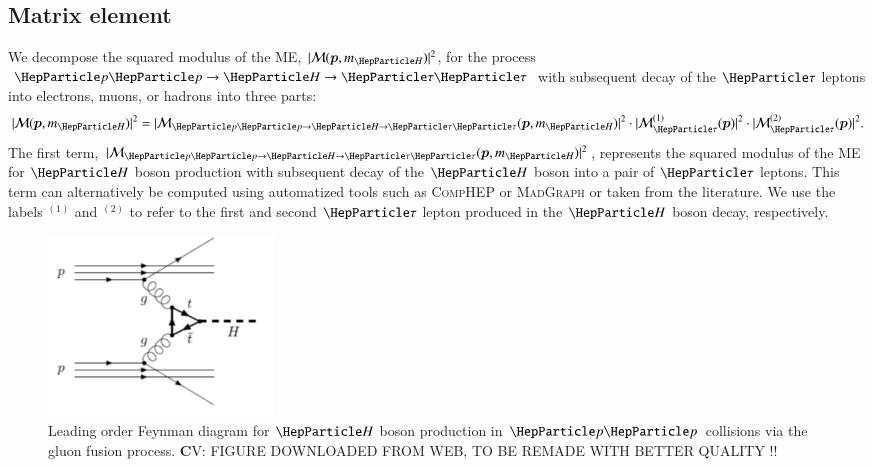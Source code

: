 \subsection{Matrix element}
\label{sec:mem_ME}

We decompose the squared modulus of the ME, $\vert \mathcal{M}(\bm{p},m_{\PHiggs}) \vert^{2}$, for the process $\Pp\Pp \to \PHiggs \to \Pgt\Pgt$
with subsequent decay of the $\Pgt$ leptons into electrons, muons, or
hadrons into three parts:
\begin{equation}
\vert \mathcal{M}(\bm{p},m_{\PHiggs}) \vert^{2} = 
 \vert \mathcal{M}_{\Pp\Pp \to \PHiggs \to \Pgt\Pgt}(\bm{p},m_{\PHiggs}) \vert^{2} 
\cdot \vert \mathcal{M}^{(1)}_{\Pgt}(\bm{p}) \vert^{2} 
\cdot \vert \mathcal{M}^{(2)}_{\Pgt}(\bm{p}) \vert^{2} .
 \label{eq:meFactorization}
\end{equation}
The first term, $\vert \mathcal{M}_{\Pp\Pp \to \PHiggs \to
  \Pgt\Pgt}(\bm{p},m_{\PHiggs}) \vert^{2}$, represents the squared
modulus of the ME for $\PHiggs$ boson production with subsequent decay of the $\PHiggs$ boson into a pair of $\Pgt$ leptons.
This term can alternatively be computed using automatized tools such as \textsc{CompHEP} or \textsc{MadGraph} or taken from the literature.
We use the labels $^{(1)}$ and $^{(2)}$ to refer to the first and second $\Pgt$ lepton produced in the $\PHiggs$ boson decay, respectively.

\begin{figure}
\begin{center}
\includegraphics*[height=48mm]{figures/ggH_FeynmanDiagram.pdf}
\end{center}
\caption{
  Leading order Feynman diagram for $\PHiggs$ boson production in $\Pp\Pp$ collisions via the gluon fusion process.
  {\textbf CV: FIGURE DOWNLOADED FROM WEB, TO BE REMADE WITH BETTER QUALITY !!}
}
\label{fig:ggH_FeynmanDiagram}
\end{figure}

